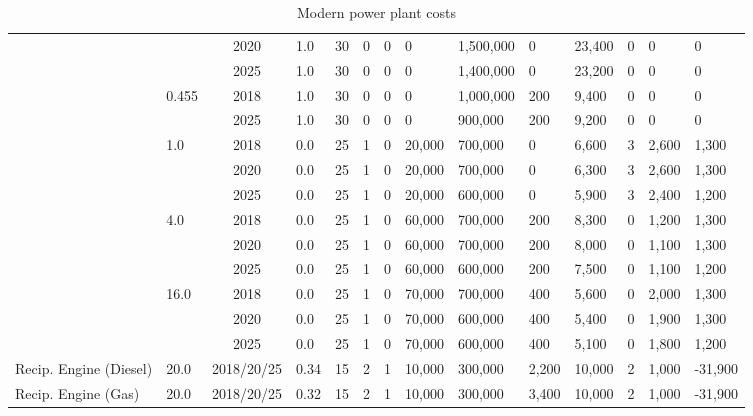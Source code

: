 \begin{table*}[]
\begin{tabularx}{1.0205\linewidth}{|l|l|c|l|l|l|l|l|l|l|l|l|l|l|}
	&  & 2020 & 1.0 & 30 & 0 & 0 & 0 & 1,500,000 & 0 & 23,400 & 0 & 0 & 0 \\ \cline{3-14} 
	&  & 2025 & 1.0 & 30 & 0 & 0 & 0 & 1,400,000 & 0 & 23,200 & 0 & 0 & 0 \\ \cline{2-14} 
	& \multirow{2}{*}{0.455} & 2018 & 1.0 & 30 & 0 & 0 & 0 & 1,000,000 & 200 & 9,400 & 0 & 0 & 0 \\ \cline{3-14} 
	&  & 2025 & 1.0 & 30 & 0 & 0 & 0 & 900,000 & 200 & 9,200 & 0 & 0 & 0 \\ \cline{2-14} 
	& \multirow{3}{*}{1.0} & 2018 & 0.0 & 25 & 1 & 0 & 20,000 & 700,000 & 0 & 6,600 & 3 & 2,600 & 1,300 \\ \cline{3-14} 
	&  & 2020 & 0.0 & 25 & 1 & 0 & 20,000 & 700,000 & 0 & 6,300 & 3 & 2,600 & 1,300 \\ \cline{3-14} 
	&  & 2025 & 0.0 & 25 & 1 & 0 & 20,000 & 600,000 & 0 & 5,900 & 3 & 2,400 & 1,200 \\ \cline{2-14} 
	& \multirow{3}{*}{4.0} & 2018 & 0.0 & 25 & 1 & 0 & 60,000 & 700,000 & 200 & 8,300 & 0 & 1,200 & 1,300 \\ \cline{3-14} 
	&  & 2020 & 0.0 & 25 & 1 & 0 & 60,000 & 700,000 & 200 & 8,000 & 0 & 1,100 & 1,300 \\ \cline{3-14} 
	&  & 2025 & 0.0 & 25 & 1 & 0 & 60,000 & 600,000 & 200 & 7,500 & 0 & 1,100 & 1,200 \\ \cline{2-14} 
	& \multirow{3}{*}{16.0} & 2018 & 0.0 & 25 & 1 & 0 & 70,000 & 700,000 & 400 & 5,600 & 0 & 2,000 & 1,300 \\ \cline{3-14} 
	&  & 2020 & 0.0 & 25 & 1 & 0 & 70,000 & 600,000 & 400 & 5,400 & 0 & 1,900 & 1,300 \\ \cline{3-14} 
	&  & 2025 & 0.0 & 25 & 1 & 0 & 70,000 & 600,000 & 400 & 5,100 & 0 & 1,800 & 1,200 \\ \hline
	Recip. Engine (Diesel) & 20.0 & 2018/20/25 & 0.34 & 15 & 2 & 1 & 10,000 & 300,000 & 2,200 & 10,000 & 2 & 1,000 & -31,900 \\ \hline
	Recip. Engine (Gas) & 20.0 & 2018/20/25 & 0.32 & 15 & 2 & 1 & 10,000 & 300,000 & 3,400 & 10,000 & 2 & 1,000 & -31,900 \\ \hline
		
	\end{tabularx}
	

	\caption{Modern power plant costs \cite{Department2016}}
	\label{table:modern_plant_costs}
\end{table*}


